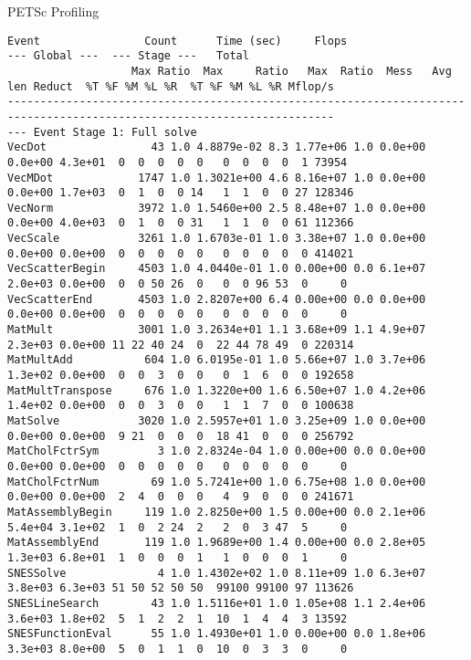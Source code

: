 \begin{frame}[fragile]{PETSc Profiling}

{ \tiny
\begin{verbatim}
Event                Count      Time (sec)     Flops                             --- Global ---  --- Stage ---   Total
                   Max Ratio  Max     Ratio   Max  Ratio  Mess   Avg len Reduct  %T %F %M %L %R  %T %F %M %L %R Mflop/s
------------------------------------------------------------------------------------------------------------------------
--- Event Stage 1: Full solve
VecDot                43 1.0 4.8879e-02 8.3 1.77e+06 1.0 0.0e+00 0.0e+00 4.3e+01  0  0  0  0  0   0  0  0  0  1 73954
VecMDot             1747 1.0 1.3021e+00 4.6 8.16e+07 1.0 0.0e+00 0.0e+00 1.7e+03  0  1  0  0 14   1  1  0  0 27 128346
VecNorm             3972 1.0 1.5460e+00 2.5 8.48e+07 1.0 0.0e+00 0.0e+00 4.0e+03  0  1  0  0 31   1  1  0  0 61 112366
VecScale            3261 1.0 1.6703e-01 1.0 3.38e+07 1.0 0.0e+00 0.0e+00 0.0e+00  0  0  0  0  0   0  0  0  0  0 414021
VecScatterBegin     4503 1.0 4.0440e-01 1.0 0.00e+00 0.0 6.1e+07 2.0e+03 0.0e+00  0  0 50 26  0   0  0 96 53  0     0
VecScatterEnd       4503 1.0 2.8207e+00 6.4 0.00e+00 0.0 0.0e+00 0.0e+00 0.0e+00  0  0  0  0  0   0  0  0  0  0     0
MatMult             3001 1.0 3.2634e+01 1.1 3.68e+09 1.1 4.9e+07 2.3e+03 0.0e+00 11 22 40 24  0  22 44 78 49  0 220314
MatMultAdd           604 1.0 6.0195e-01 1.0 5.66e+07 1.0 3.7e+06 1.3e+02 0.0e+00  0  0  3  0  0   0  1  6  0  0 192658
MatMultTranspose     676 1.0 1.3220e+00 1.6 6.50e+07 1.0 4.2e+06 1.4e+02 0.0e+00  0  0  3  0  0   1  1  7  0  0 100638
MatSolve            3020 1.0 2.5957e+01 1.0 3.25e+09 1.0 0.0e+00 0.0e+00 0.0e+00  9 21  0  0  0  18 41  0  0  0 256792
MatCholFctrSym         3 1.0 2.8324e-04 1.0 0.00e+00 0.0 0.0e+00 0.0e+00 0.0e+00  0  0  0  0  0   0  0  0  0  0     0
MatCholFctrNum        69 1.0 5.7241e+00 1.0 6.75e+08 1.0 0.0e+00 0.0e+00 0.0e+00  2  4  0  0  0   4  9  0  0  0 241671
MatAssemblyBegin     119 1.0 2.8250e+00 1.5 0.00e+00 0.0 2.1e+06 5.4e+04 3.1e+02  1  0  2 24  2   2  0  3 47  5     0
MatAssemblyEnd       119 1.0 1.9689e+00 1.4 0.00e+00 0.0 2.8e+05 1.3e+03 6.8e+01  1  0  0  0  1   1  0  0  0  1     0
SNESSolve              4 1.0 1.4302e+02 1.0 8.11e+09 1.0 6.3e+07 3.8e+03 6.3e+03 51 50 52 50 50  99100 99100 97 113626
SNESLineSearch        43 1.0 1.5116e+01 1.0 1.05e+08 1.1 2.4e+06 3.6e+03 1.8e+02  5  1  2  2  1  10  1  4  4  3 13592
SNESFunctionEval      55 1.0 1.4930e+01 1.0 0.00e+00 0.0 1.8e+06 3.3e+03 8.0e+00  5  0  1  1  0  10  0  3  3  0     0

\end{verbatim}}
\end{frame}
